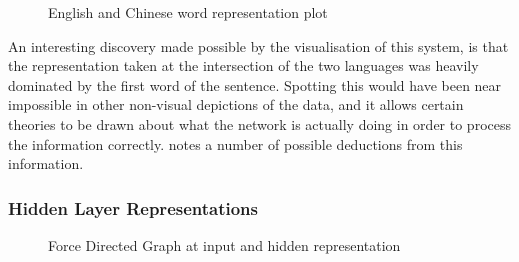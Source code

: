 \documentclass[a4paper,11pt,titlepage]{article}
\begin{document}
 		\begin{figure}[H]
    			\caption{English and Chinese word representation plot}%
    			\label{fig:embeddings}
		\end{figure}	
		
		
		\par 
		An interesting discovery made possible by the visualisation of this system, is that the representation taken at the intersection of the two languages was heavily dominated by the first word of the sentence. Spotting this would have been near impossible in other non-visual depictions of the data, and it allows certain theories to be drawn about what the network is actually doing in order to process the information correctly. \cite{Olah2014} notes a number of possible deductions from this information.
		
		\subsubsection{Hidden Layer Representations}
 		
 		 \begin{figure}[H]
    			\caption{Force Directed Graph at input and hidden representation}%
    			\label{fig:fdg}
		\end{figure}	
		
\end{document}

